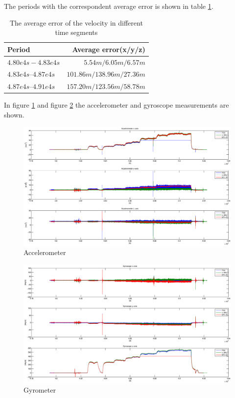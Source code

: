 The periods with the correspondent average error is shown in table \ref{ct_vel_error}.
\begin{table}[h]
\centering
\begin{tabular}{|l|r|}
\hline
Period & Average error(x/y/z) \\
\hline
$4.80e4 s - 4.83e4 s$&$5.54 m / 6.05 m / 6.57 m$\\
\hline
$4.83e4 s – 4.87e4 s$&$101.86 m / 138.96 m/ 27.36 m$\\
\hline
$4.87e4s – 4.91e4 s$&$157.20 m / 123.56 m / 58.78 m$\\
\hline
\end{tabular}
\caption{The average error of the velocity in different time segments}
\label{ct_vel_error}
\end{table}
In figure \ref{ct_acc} and figure \ref{ct_gyro} the accelerometer and gyroscope measurements are shown. 
\begin{figure}[h]
\includegraphics[width=1.2\textwidth]{pictures/ct_acc.eps}
\caption{Accelerometer}
\label{ct_acc}
\end{figure}
\begin{figure}[h]
\includegraphics[width=1.2\textwidth]{pictures/ct_gyro.eps}
\caption{Gyrometer}
\label{ct_gyro}
\end{figure}
